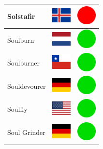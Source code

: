 \documentclass[12pt, a4paper, twoside]{report}
\begin{document}
\begin{center}
\begin{longtable}{|p{5cm}|p{2cm}|p{2cm}|}
Solstafir & \includegraphics[width=1cm]{4x3/is} & \includegraphics[width=1cm]{likes/n} \\ \hline
Soulburn & \includegraphics[width=1cm]{4x3/nl} & \includegraphics[width=1cm]{likes/y} \\ \hline
Soulburner & \includegraphics[width=1cm]{4x3/cl} & \includegraphics[width=1cm]{likes/y} \\ \hline
Souldevourer & \includegraphics[width=1cm]{4x3/de} & \includegraphics[width=1cm]{likes/y} \\ \hline
Soulfly & \includegraphics[width=1cm]{4x3/us} & \includegraphics[width=1cm]{likes/y} \\ \hline
Soul Grinder & \includegraphics[width=1cm]{4x3/de} & \includegraphics[width=1cm]{likes/y} \\ \hline

\end{longtable}
\end{center}
\end{document}
